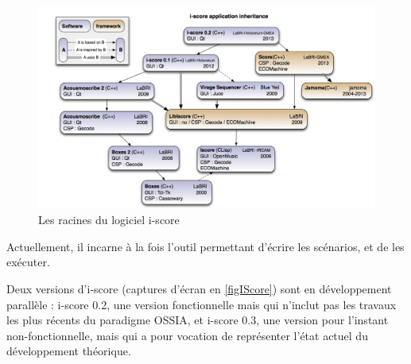 \begin{figure}[H]
	\centering
	\includegraphics[scale=0.4]{images/iscoreHeritage.png}
	\caption{Les racines du logiciel i-score}
	\label{figheritageIScore}
\end{figure}

Actuellement, il incarne à la fois l'outil permettant d'écrire les scénarios, et de les exécuter.

Deux versions d'i-score (captures d'écran en \cref{figIScore}) sont en développement parallèle : i-score 0.2, une version fonctionnelle mais qui n'inclut pas les travaux les plus récents du paradigme \ac{OSSIA}, et i-score 0.3, une version pour l'instant non-fonctionnelle, mais qui a pour vocation de représenter l'état actuel du développement théorique.

